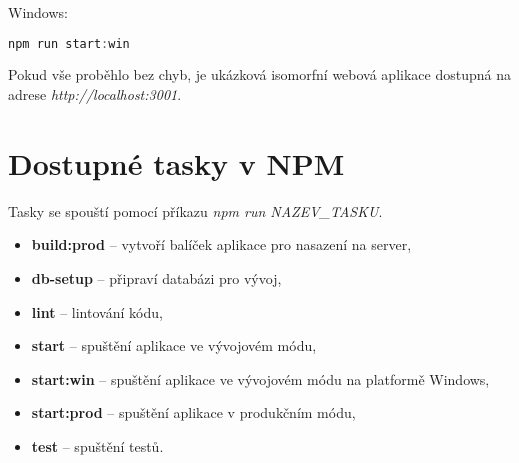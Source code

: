 Windows:
\begin{lstlisting}[language=Javascript]
npm run start:win
\end{lstlisting}

Pokud vše proběhlo bez chyb, je ukázková isomorfní webová aplikace dostupná na adrese \textit{http://localhost:3001}.

\section*{Dostupné tasky v NPM}
Tasky se spouští pomocí příkazu \textit{npm run NAZEV\_TASKU}.

\begin{itemize}
\item \textbf{build:prod} – vytvoří balíček aplikace pro nasazení na server,
\item \textbf{db-setup} – připraví databázi pro vývoj,
\item \textbf{lint} – lintování kódu,
\item \textbf{start} – spuštění aplikace ve vývojovém módu,
\item \textbf{start:win} – spuštění aplikace ve vývojovém módu na platformě Windows,
\item \textbf{start:prod} – spuštění aplikace v produkčním módu,
\item \textbf{test} – spuštění testů.
\end{itemize}


